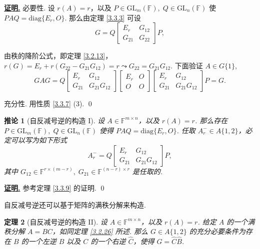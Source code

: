 \documentclass[10pt,openany]{article}
\theoremstyle{thmstyle} %
\newtheorem{theorem}{定理}[subsection]
\theoremstyle{defstyle} %
\newtheorem{corollary}[theorem]{推论}
\theoremstyle{prostyle} %
\theoremstyle{exastyle}
\theoremstyle{remstyle}
\renewenvironment{proof}[1][证明]{\par\underline{\textbf{#1.}} \;\fangsong}{\qed\par}
\newcommand{\F}{\mathbb{F}}
\newcommand{\gfn}{\text{GL}_n(\mathbb{F})}
\newcommand{\gfm}{\text{GL}_m(\mathbb{F})}
\newcommand{\mn}{^{m \times n}}
\newcommand{\diag}{\mathrm{diag}}
\begin{document}
\begin{proof}
	必要性. 设 \( r(A)=r \)，以及 \( P \in \gfm, \; Q \in \gfn \) 使 \( PAQ=\diag\{E_r,O\} \). 那么由定理 \ref{3.3.3} 可设
	\[ G=Q\begin{bmatrix}
		E_r & G_{12} \\
		G_{21} & G_{22}
	\end{bmatrix}P, \]
	
	由秩的降阶公式，即定理 \ref{3.2.13}，\( r(G)=E_r+r(G_{22}-G_{21}G_{12})=r \leadsto G_{22}=G_{21}G_{12} \). 下面验证 \( A \in G\{1\} \),
	\[ GAG=Q\begin{bmatrix}
		E_r & G_{12} \\
		G_{21} & G_{21}G_{12}
	\end{bmatrix}\begin{bmatrix}
	E_r & O \\
	O & O
	\end{bmatrix}\begin{bmatrix}
	E_r & G_{12} \\
	G_{21} & G_{21}G_{12}
	\end{bmatrix}P=G. \]
	
	充分性. 用性质 \ref{3.3.7} (3).
\end{proof}

\begin{corollary}[自反减号逆的构造 I] \label{3.3.10}
	设 \( A \in \F\mn \)，以及 \( r(A)=r \). 那么存在 \( P \in \gfm, \; Q \in \gfn \) 使得 \( PAQ=\diag\{E_r,O\} \). 任取 \( A_r^{-} \in A\{1,2\} \)，必定可以写为如下形式
	\[ A_r^{-}=Q\begin{bmatrix}
		E_r & G_{12} \\
		G_{21} & G_{21}G_{12}
	\end{bmatrix}P, \]
	其中 \( G_{12} \in \F^{r \times (m-r)}, \; G_{21} \in \F^{(n-r) \times r}\) 是任取的.
\end{corollary}

\begin{proof}
	参考定理 \ref{3.3.9} 的证明.
\end{proof}

自反减号逆还可以基于矩阵的满秩分解来构造.

\begin{theorem}[自反减号逆的构造 II]
	设 \( A \in \F\mn \)，以及 \( r(A)=r \). 给定 \( A \) 的一个满秩分解 \( A=BC \)，如同定理 \ref{3.2.26} 所述. 那么 \( G \in A\{1,2\} \) 的充分必要条件为存在 \( B \) 的一个左逆 \( \hat{B} \) 以及 \( C \) 的一个右逆 \( \hat{C} \)，使得 \( G=\hat{C}\hat{B} \).
\end{theorem}
\end{document}
